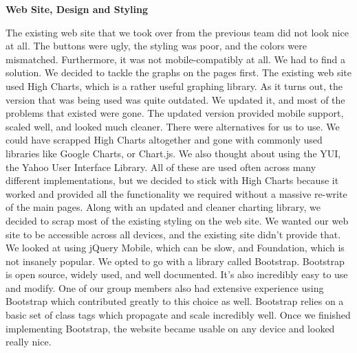 \documentclass{report}
\begin{document}
\begin{center}
	\textbf{Web Site, Design and Styling}
\end{center}
\indent
\indent
The existing web site that we took over from the previous team did not look nice at all. The buttons were ugly, the styling was poor, and the colors were mismatched. Furthermore, it was not mobile-compatibly at all. We had to find a solution.
\newline
\indent
We decided to tackle the graphs on the pages first. The existing web site used High Charts, which is a rather useful graphing library. As it turns out, the version that was being used was quite outdated. We updated it, and most of the problems that existed were gone. The updated version provided mobile support, scaled well, and looked much cleaner.
\newline
\indent
There were alternatives for us to use. We could have scrapped High Charts altogether and gone with commonly used libraries like Google Charts, or Chart.js. We also thought about using the YUI, the Yahoo User Interface Library. All of these are used often across many different implementations, but we decided to stick with High Charts because it worked and provided all the functionality we required without a massive re-write of the main pages.
\newline
\indent
Along with an updated and cleaner charting library, we decided to scrap most of the existing styling on the web site. We wanted our web site to be accessible across all devices, and the existing site didn't provide that. We looked at using jQuery Mobile, which can be slow, and Foundation, which is not insanely popular. We opted to go with a library called Bootstrap. Bootstrap is open source, widely used, and well documented. It's also incredibly easy to use and modify. One of our group members also had extensive experience using Bootstrap which contributed greatly to this choice as well. Bootstrap relies on a basic set of class tags which propagate and scale incredibly well. Once we finished implementing Bootstrap, the website became usable on any device and looked really nice.
\newpage
\end{document}
